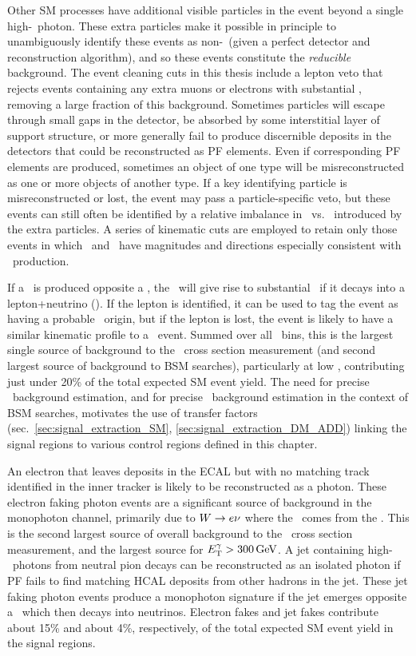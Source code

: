 Other SM processes have additional visible particles in the event beyond a single high-\pT\ photon. These extra particles make it possible in principle to unambiguously
identify these events as non-\zinvg\ (given a perfect detector and reconstruction algorithm), and so these events constitute the \textit{reducible} background.
The event cleaning cuts in this thesis include a lepton veto that rejects events containing any extra muons or electrons with substantial \pT,
removing a large fraction of this background.
Sometimes particles will escape through small gaps in the detector, be absorbed by some interstitial layer of support structure, or more generally fail to produce
discernible deposits in the detectors that could be reconstructed as PF elements. Even if corresponding PF elements are produced, sometimes an object of one type will
be misreconstructed as one or more objects of another type. If a key identifying particle is misreconstructed or lost, the event may pass a particle-specific veto, but these
events can still often be identified by a relative imbalance in \vecpTgamma\ vs. \vecMET\ introduced by the extra particles.
A series of kinematic cuts are employed to retain only those events in which \vecpTgamma\ and \vecMET\ have magnitudes and directions especially consistent with
\zinvg\ production.

If a \PW\ is produced opposite a \Pgamma, the \PW\ will give rise to substantial \MET\ if it decays into a lepton+neutrino (\wlng). If the lepton is identified, it can be used
to tag the event as having a probable \wlng\ origin, but if the lepton is lost, the event is likely to have a similar kinematic profile to
a \zinvg\ event. Summed over all \ETgamma\ bins, this is the largest single source of background to the \zinvg\ cross section measurement (and second largest source of background
to BSM searches), particularly at low \ETgamma, contributing just under 20\% of the total expected SM event yield.
The need for precise \wlng\ background estimation, and for precise \zinvg\ background estimation in the context of BSM searches, motivates the use of transfer
factors (sec.~\ref{sec:signal_extraction_SM}, \ref{sec:signal_extraction_DM_ADD}) linking the signal regions to various control regions defined in this chapter.

An electron that leaves deposits
in the ECAL but with no matching track identified in the inner tracker is likely to be reconstructed as a photon. These electron faking photon events are a significant
source of background in the monophoton channel, primarily due to $\PW \to \Pe\Pn$ where the \MET\ comes from the \Pn. This is the second largest source of overall background to
the \zinvg\ cross section measurement, and the largest source for $\ETgamma > 300\unit{GeV}$. A jet containing high-\pT\ photons from neutral
pion decays can be reconstructed as an isolated photon if PF fails to find matching HCAL deposits from other hadrons in the jet. These jet faking photon events produce a monophoton
signature if the jet emerges opposite a \PZ\ which then decays into neutrinos. Electron fakes and jet fakes contribute about 15\% and about 4\%, respectively, of the total
expected SM event yield in the signal regions.

